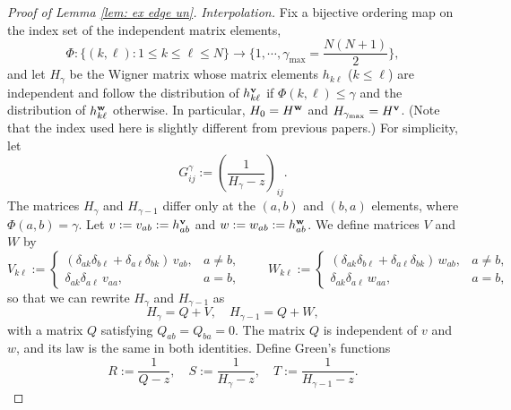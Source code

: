 \begin{proof}[Proof of Lemma \ref{lem: ex edge un}]
\textit{Interpolation.} Fix a bijective ordering map on the index set of the independent matrix elements,
\begin{equation} \label{eq:ordering}
\Phi: \{ (k, \ell) : 1 \leq k \leq \ell \leq N \} \to \{ 1, \cdots, \gamma_{\max} = \frac{N(N+1)}{2} \},
\end{equation}
and let $H_{\gamma}$ be the Wigner matrix whose matrix elements $h_{k \ell}$ ($k\le\ell$) are independent and follow the distribution of $h_{k \ell}^{\mathbf{v}}$ if $\Phi(k, \ell) \leq \gamma$ and the distribution of $h_{k \ell}^{\mathbf{w}}$ otherwise. In particular, $H_0 = H^{\mathbf{w}}$ and $H_{\gamma_{\max}} = H^{\mathbf{v}}$. (Note that the index used here is slightly different from previous papers.) For simplicity, let
\begin{equation}
G^{\gamma}_{ij} := \left( \frac{1}{H_{\gamma} -z} \right)_{ij}.
\end{equation}
The matrices $H_{\gamma}$ and $H_{\gamma -1}$ differ only at the $(a, b)$ and $(b, a)$ elements, where $\Phi (a, b) = \gamma$. Let $v:=v_{ab} := h_{ab}^{\mathbf{v}}$ and $w:=w_{ab} := h_{ab}^{\mathbf{w}}$. We define matrices $V$ and $W$ by
\begin{equation}
V_{k \ell} := \begin{cases} (\delta_{ak} \delta_{b \ell} + \delta_{a \ell} \delta_{bk})\, v_{ab}, & a\ne b,\\ \delta_{ak}\delta_{a\ell}\, v_{aa}, & a=b,\end{cases} \qquad W_{k \ell} := \begin{cases} (\delta_{ak} \delta_{b \ell} + \delta_{a \ell} \delta_{bk})\, w_{ab}, & a\ne b,\\ \delta_{ak}\delta_{a\ell}\, w_{aa}, & a=b,\end{cases}
\end{equation}
so that we can rewrite $H_{\gamma}$ and $H_{\gamma -1}$ as
\begin{equation}
H_{\gamma} = Q + V, \quad H_{\gamma -1} = Q + W,
\end{equation}
with a matrix $Q$ satisfying $Q_{ab} = Q_{ba} = 0$. The matrix $Q$ is independent of $v$ and $w$, and its law is the same in both identities. Define Green's functions
\begin{equation} \label{eq:green_fns}
R := \frac{1}{Q-z}, \quad S := \frac{1}{H_{\gamma} - z}, \quad T := \frac{1}{H_{\gamma -1} - z}.
\end{equation}


\end{proof}
